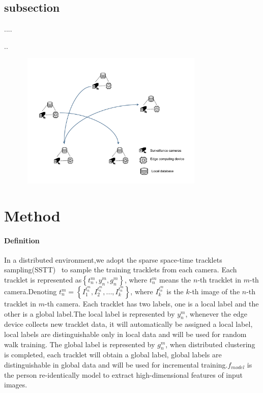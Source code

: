 \documentclass{article}
\begin{document}
\subsection{subsection}
....

..


\begin{figure}[htb]
    \includegraphics[width=9cm,height=6.5cm]{fig_1.pdf}
    \caption{}
    \label{}
\end{figure}

\section{Method}
\paragraph{Definition} 
In a distributed environment,we adopt the sparse space-time tracklets sampling(SSTT)~\cite{li2018unsupervised} to sample the training tracklets from each camera. Each tracklet is represented as$\left \{t_{n}^{m}, y_{n}^{m}, g_{n}^{m}\right \}$, where $t_{n}^{m}$ means the $n$-th tracklet in $m$-th camera.Denoting $t_{n}^{m}=\left \{  I_{1}^{t_{n}^{m}},  I_{2}^{t_{n}^{m}},...,I_{k}^{t_{n}^{m}} \right \}$, where $I_{k}^{t_{n}^{m}}$ is the $k$-th image of the $n$-th tracklet in $m$-th camera. Each tracklet has two labels, one is a local label and the other is a global label.The local label is represented by $y_{n}^{m}$, whenever the edge device collects new tracklet data, it will automatically be assigned a local label, local labels are distinguishable only in local data and will be used for random walk training. The global label is represented by $g_{n}^{m}$, when distributed clustering is completed, each tracklet will obtain a global label, global labels are distinguishable in global data and will be used for incremental training.$f_{model}$ is the person re-identically model to extract high-dimensional features of input images.
\end{document}
